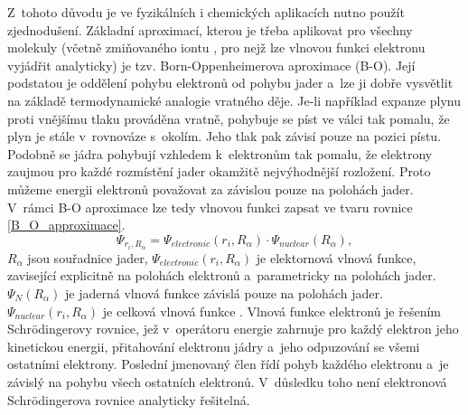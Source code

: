 \documentclass[
digital, %
table,   %
lof,     %
lot,     %
oneside,
]{fithesis3}
\begin{document}
Z~tohoto důvodu je ve fyzikálních i chemických aplikacích nutno použít zjednodušení. Základní aproximací, kterou je třeba aplikovat pro všechny molekuly (včetně zmiňovaného iontu , pro nejž lze vlnovou funkci elektronu vyjádřit analyticky) je tzv. Born-Oppenhei\-me\-ro\-va aproximace (B-O).
Její podstatou je oddělení pohybu elektronů od pohybu jader a~lze ji dobře vysvětlit na základě termodynamické analogie vratného děje. Je-li například expanze plynu proti vnějšímu tlaku prováděna vratně, pohybuje se píst ve válci tak pomalu, že plyn je stále v~rovnováze s~okolím. Jeho tlak pak závisí pouze na pozici pístu. Podobně se jádra pohybují vzhledem k~elektronům tak pomalu, že elektrony zaujmou pro každé rozmístění jader okamžitě nejvýhodnější rozložení. Proto můžeme energii elektronů považovat za závislou pouze na polohách jader. V~rámci B-O aproximace lze tedy vlnovou funkci zapsat ve tvaru rovnice \ref{B_O_approximace}.
\begin{equation}
\Psi_{r_i,R_{\alpha}} = \Psi_{electronic}(r_i,R_{\alpha}) \cdot \Psi_{nuclear}(R_{\alpha}),
\label{B_O_approximace}
\end{equation}
$R_{\alpha}$ jsou souřadnice jader, $\Psi_{electronic}(r_i,R_{\alpha})$ je elektornová vlnová funkce, zavisející explicitně na polohách elektronů a~parametricky na polohách jader. $\Psi_N(R_{\alpha})$ je jaderná vlnová funkce závislá pouze na polohách jader. $ \Psi_{nuclear}(r_i, R_{\alpha}) $ je celková vlnová funkce \cite{lechamolecularmodeling}.
Vlnová funkce elektronů je řešením Schrödingerovy rovnice, jež v~operátoru energie zahrnuje pro každý elektron jeho kinetickou energii, přitahování elektronu jádry a~jeho odpuzování se všemi ostatními elektrony. Poslední jmenovaný člen řídí pohyb každého elektronu a~je závislý na pohybu všech ostatních elektronů. V~důsledku toho není elektronová Schrödingerova rovnice analyticky řešitelná.\\
\end{document}
